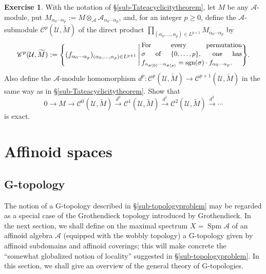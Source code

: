 \documentclass[a4paper,12pt, dvipdfmx]{jsbook}
\def\til#1{\widetilde{#1}}%
\def\sgn{\mathop{\mathrm{sgn}}\nolimits}
\def\Spm{\mathop{\mathrm{Spm}}\nolimits}
\theoremstyle{plain}
\theoremstyle{definition}
\newtheorem{exer}{\bfseries Exercise}[chapter]
\newcounter{chushaku}
\begin{document}
\begin{exer}\label{exer-Tateacyclicitymodule1}{\rm 
With the notation of \S\ref{sub-Tateacyclicitytheorem}, let $M$ be any $\mathcal{A}$-module, put $M_{\alpha_0\cdots\alpha_p}:=M\otimes_{\mathcal{A}}\mathcal{A}_{\alpha_0\cdots\alpha_p}$, and, for an integer $p\geq 0$, define the $\mathcal{A}$-submodule $\mathscr{C}^p(\mathcal{U},\til{M})$ of the direct product $\prod_{(\alpha_0,\ldots,\alpha_p)\in L^{p+1}}M_{\alpha_0\cdots\alpha_p}$ by
$$
\mathscr{C}^p(\mathcal{U},\til{M}):=\Bigg\{(f_{\alpha_0\cdots\alpha_p})_{(\alpha_0,\ldots,\alpha_p)\in L^{p+1}}\,\Bigg|\,\begin{minipage}{14em}{\small 
For every permutation $\sigma$ of $\{0,\ldots,p\}$, one has $f_{\alpha_{\sigma(0)}\cdots\alpha_{\sigma(p)}}=\sgn(\sigma) \cdot f_{\alpha_0\cdots\alpha_p}$.}
\end{minipage}\Bigg\}.
$$
Also define the $\mathcal{A}$-module homomorphism $d^p\colon\mathscr{C}^p(\mathcal{U},\til{M})\rightarrow\mathscr{C}^{p+1}(\mathcal{U},\til{M})$ in the same way as in \S\ref{sub-Tateacyclicitytheorem}.
Show that
$$
0\longrightarrow M\longrightarrow \mathscr{C}^0(\mathcal{U},\til{M})\stackrel{d^0}{\longrightarrow}\mathscr{C}^1(\mathcal{U},\til{M})\stackrel{d^1}{\longrightarrow}\mathscr{C}^2(\mathcal{U},\til{M})\stackrel{d^2}{\longrightarrow}\cdots
$$
is exact.}
\end{exer}












\setcounter{chushaku}{0}
\chapter{Affinoid spaces}\label{CH-AFFINOIDSPACES}
\section{G-topology}\label{sec-Gtopology}
The notion of a G-topology described in \S\ref{sub-topologyproblem} may be regarded as a special case of the Grothendieck topology introduced by Grothendieck.
In the next section, we shall define on the maximal spectrum $X=\Spm\mathcal{A}$ of an affinoid algebra $\mathcal{A}$ (equipped with the wobbly topology) a G-topology given by affinoid subdomains and affinoid coverings; this will make concrete the ``somewhat globalized notion of locality'' suggested in \S\ref{sub-topologyproblem}.
In this section, we shall give an overview of the general theory of G-topologies.
\end{document}
